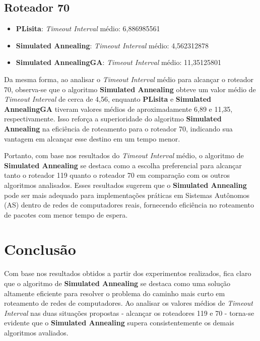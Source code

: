 \documentclass[conference]{IEEEtran}
\begin{document}
\subsection{Roteador 70}

\begin{itemize}
    \item \textbf{PLisita}: \textit{Timeout Interval} médio: 6,886985561
    \item \textbf{Simulated Annealing}: \textit{Timeout Interval} médio: 4,562312878
    \item \textbf{Simulated AnnealingGA}: \textit{Timeout Interval} médio: 11,35125801
\end{itemize}

Da mesma forma, ao analisar o \textit{Timeout Interval} médio para alcançar o roteador 70, observa-se que o algoritmo \textbf{Simulated Annealing} obteve um valor médio de \textit{Timeout Interval} de cerca de 4,56, enquanto \textbf{PLisita} e \textbf{Simulated AnnealingGA} tiveram valores médios de aproximadamente 6,89 e 11,35, respectivamente. Isso reforça a superioridade do algoritmo \textbf{Simulated Annealing} na eficiência de roteamento para o roteador 70, indicando sua vantagem em alcançar esse destino em um tempo menor.

Portanto, com base nos resultados do \textit{Timeout Interval} médio, o algoritmo de \textbf{Simulated Annealing} se destaca como a escolha preferencial para alcançar tanto o roteador 119 quanto o roteador 70 em comparação com os outros algoritmos analisados. Esses resultados sugerem que o \textbf{Simulated Annealing} pode ser mais adequado para implementações práticas em Sistemas Autônomos (AS) dentro de redes de computadores reais, fornecendo eficiência no roteamento de pacotes com menor tempo de espera.

\section{Conclusão}

Com base nos resultados obtidos a partir dos experimentos realizados, fica claro que o algoritmo de \textbf{Simulated Annealing} se destaca como uma solução altamente eficiente para resolver o problema do caminho mais curto em roteamento de redes de computadores. Ao analisar os valores médios de \textit{Timeout Interval} nas duas situações propostas - alcançar os roteadores 119 e 70 - torna-se evidente que o \textbf{Simulated Annealing} supera consistentemente os demais algoritmos avaliados.
\end{document}
